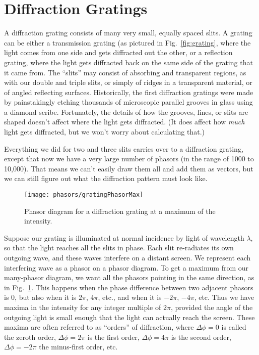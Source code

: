 \section{Diffraction Gratings}
\label{sec:diffraction_gratings}

A  diffraction grating  consists of  many very  small,  equally spaced
slits. A grating can be either a transmission grating (as pictured
in Fig.~\ref{fig:grating}, where the light
comes from one side and gets diffracted out the other, or a reflection
grating, where the light gets diffracted  back on the same side of the
grating that it came from.  The ``slits'' may consist of absorbing and
transparent regions, as with our double and triple slits, or simply of
ridges in  a transparent material,  or of angled  reflecting surfaces.
Historically,   the   first   diffraction   gratings  were   made   by
painstakingly  etching thousands  of microscopic  parallel  grooves in
glass using a diamond scribe.  Fortunately, the details of how the
grooves, lines, or slits are shaped doesn't affect where the light gets diffracted. (It does affect how \emph{much} light gets diffracted, but we won't worry about calculating that.) 

Everything  we  did  for  two  and  three  slits  carries  over  to  a
diffraction grating,  except that now we  have a very  large number of
phasors (in the  range of 1000 to 10,000). That  means we can't easily
draw them  all and add  them as vectors,  but we can still  figure out
what the diffraction pattern must look like. 


\begin{figure}
\begin{center}\texttt{[image: phasors/gratingPhasorMax]}
\end{center}
\caption{\label{gratingMaxFig}Phasor diagram for a diffraction grating
at a maximum of the intensity.}
\end{figure}


Suppose our grating is illuminated at normal incidence by light of
wavelength $\lambda$, so that the light reaches all the slits in
phase.  Each slit re-radiates its own outgoing wave, and these waves
interfere on a distant screen. We represent each interfering wave as
a phasor on a phasor diagram.  To get a maximum from our many-phasor
diagram, we want all the phasors pointing in the same direction, as
in Fig.~\ref{gratingMaxFig}.  This happens when the phase difference
between two adjacent phasors is $0$, but also when it is $2\pi$, $4\pi$,
etc., and when it is $-2\pi$, $-4\pi$, etc.  Thus we have maxima in the
intensity for any integer multiple of $2\pi$, provided the angle of the
outgoing light is small enough that the light can actually reach the
screen. These maxima are often referred to as ``orders'' of diffraction,
where $\Delta\phi=0$ is called the zeroth order, $\Delta\phi=2\pi$ is the
first order, $\Delta\phi = 4\pi$ is the second order, $\Delta\phi=-2\pi$
the minus-first order, etc.

